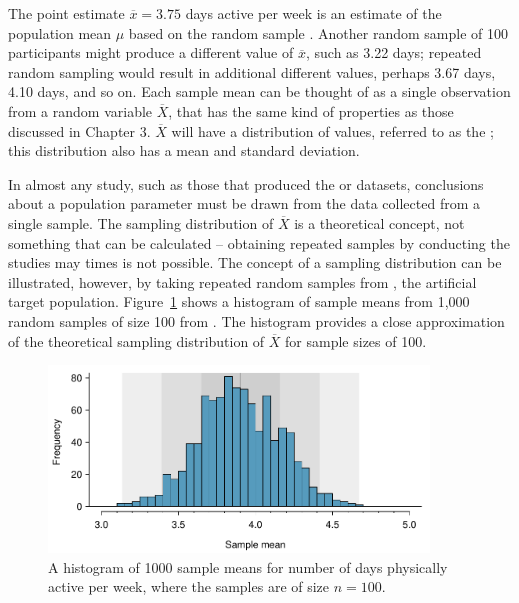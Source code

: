 \begin{spacing}{1.5}
The point estimate $\overline{x} = 3.75$ days active per week is an estimate of the population mean $\mu$ based on the random sample . Another random sample of 100 participants might produce a different value of $\overline{x}$, such as 3.22 days; repeated random sampling would result in additional different values, perhaps 3.67 days, 4.10 days, and so on. Each sample mean can be thought of as a single observation from a random variable $\overline{X}$, that has the same kind of properties as those discussed in Chapter 3. $\overline{X}$ will have a distribution of values, referred to as the ; this distribution also has a mean and standard deviation.

In almost any study, such as those that produced the  or  datasets, conclusions about a population parameter must be drawn from the data collected from a single sample. The sampling distribution of $\overline{X}$ is a theoretical concept, not something that can be calculated -- obtaining repeated samples by conducting the studies may times is not possible. The concept of a sampling distribution can be illustrated, however, by taking repeated random samples from , the artificial target population. Figure~\ref{yrbssActive1000SampDist} shows a histogram of sample means from 1,000 random samples of size 100 from . The histogram provides a close approximation of the theoretical sampling distribution of $\overline{X}$ for sample sizes of 100. 

\begin{figure}[h]
   \centering
   \includegraphics[width=0.9\textwidth]
{ch_inference_foundations_oi_biostat/figures/yrbssActive1000SampDist/yrbssActive1000SampDist}
   \caption{A histogram of 1000 sample means for number of days physically active per week, where the samples are of size $n=100$.}
   \label{yrbssActive1000SampDist}
\end{figure}


\end{spacing}
